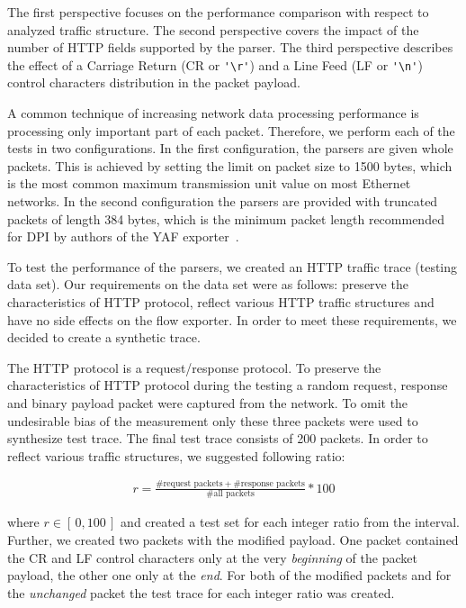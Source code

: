 The first perspective focuses on the performance comparison with respect to analyzed traffic structure. The second perspective covers the impact of the number of HTTP fields supported by the parser. The third perspective describes the effect of a Carriage Return (CR or \verb!'\r'!) and a Line Feed  (LF or \verb!'\n'!) control characters distribution in the packet payload.

A common technique of increasing network data processing performance is processing only important part of each packet. Therefore, we perform each of the tests in two configurations. In the first configuration, the parsers are given whole packets. This is achieved by setting the limit on packet size to 1500 bytes, which is the most common maximum transmission unit value on most Ethernet networks. In the second configuration the parsers are provided with truncated packets of length 384 bytes, which is the minimum packet length recommended for DPI by authors of the YAF exporter~\cite{Inacio-2010-YAF}.

To test the performance of the parsers, we created an HTTP traffic trace (testing data set). Our requirements on the data set were as follows: preserve the characteristics of HTTP protocol, reflect various HTTP traffic structures and have no side effects on the flow exporter. In order to meet these requirements, we decided to create a synthetic trace.

The HTTP protocol is a request/response protocol. To preserve the characteristics of HTTP protocol during the testing a random request, response and binary payload packet were captured from the network. To omit the undesirable bias of the measurement only these three packets were used to synthesize test trace. The final test trace consists of 200 packets. In order to reflect various traffic structures, we suggested following ratio:

\begin{align}
       r = \frac{\# \text{request packets}+\#\text{response packets}}{\#\text{all packets}}*100
\end{align}

where $r \in [\,0,100\,]$ and created a test set for each integer ratio from the interval. Further, we created two packets with the modified payload. One packet contained the CR and LF control characters only at the very \emph{beginning} of the packet payload, the other one only at the \emph{end}. For both of the modified packets and for the \emph{unchanged} packet the test trace for each integer ratio was created.

